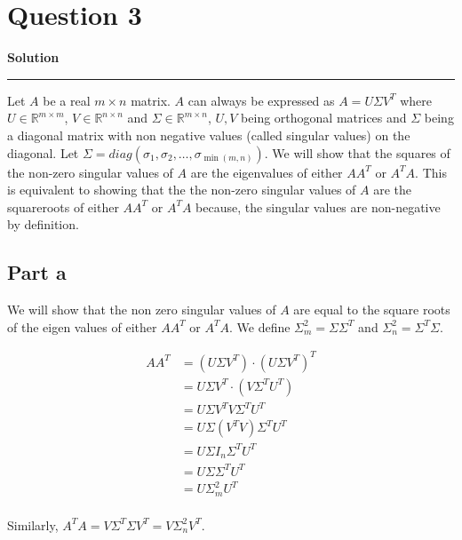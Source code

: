 \documentclass[a4paper,12pt]{article}
\title{\cooltitle{CS663 Assignment-4}}
\author{{\bf Saksham Rathi, Kavya Gupta, Shravan Srinivasa Raghavan} \\
\small Department of Computer Science, \\
Indian Institute of Technology Bombay \\}
\date{}
\newenvironment{solution}[2][]{%
    \begin{mdframed}[linecolor=blue!70!black, linewidth=2pt, roundcorner=10pt, backgroundcolor=yellow!10!white, skipabove=12pt, skipbelow=12pt]%
        \textbf{\large #2}
        \par\noindent\rule{\textwidth}{0.4pt}
}{
    \end{mdframed}
}
\begin{document}
\maketitle

\section*{Question 3}

\begin{solution}{Solution}
    Let $A$ be a real $m \times n$ matrix. $A$ can always be expressed as $A = U \Sigma V^{T}$ where 
    $U \in \mathbb{R}^{m \times m}$, $V \in \mathbb{R}^{n \times n}$ and $\Sigma \in \mathbb{R}^{m \times n}$, 
    $U,V$ being orthogonal matrices and $\Sigma$ being a diagonal matrix with non negative values (called singular values)
    on the diagonal. Let $\Sigma = diag(\sigma_{1},\sigma_{2}, \dots,\sigma_{\min(m,n)})$. We will show that the squares 
    of the non-zero singular values of $A$ are the eigenvalues of either $AA^{T}$ or $A^{T}A$. This is equivalent to 
    showing that the the non-zero singular values of $A$ are the squareroots of either $AA^{T}$ or $A^{T}A$ because,
    the singular values are non-negative by definition. 
    \subsection*{Part a}
      We will show that the non zero singular values of $A$ are equal to the square roots of the eigen values of either 
      $AA^{T}$ or $A^{T}A$. We define $\Sigma_{m}^{2} = \Sigma \Sigma^{T}$ and $\Sigma^{2}_{n} = \Sigma^{T} \Sigma$.

      \begin{align*}
        AA^{T} &= (U \Sigma V^{T}) \cdot {(U \Sigma V^{T})}^{T} \\
               &= U \Sigma V^{T} \cdot (V \Sigma^{T} U^{T}) \\
               &= U \Sigma V^{T} V \Sigma^{T} U^{T} \\
               &= U \Sigma (V^{T}V) \Sigma^{T} U^{T} \\ 
               &= U \Sigma I_{n} \Sigma ^{T} U^{T} \\
               &= U \Sigma \Sigma^{T} U^{T} \\
               &= U \Sigma^{2}_{m} U^{T} \\
      \end{align*}

      Similarly, $A^{T}A = V \Sigma^{T} \Sigma V^{T} = V \Sigma_{n}^{2} V^{T}$.


\end{solution}
\end{document}
